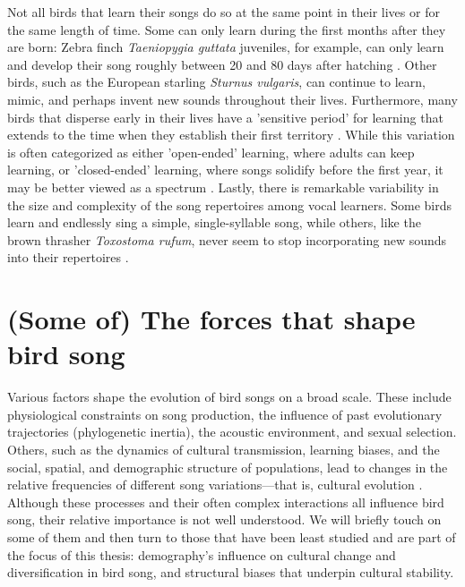 Not all birds that learn their songs do so at the same point in their lives or for the same length of time. Some can only learn during the first months after they are born: Zebra finch \textit{Taeniopygia guttata} juveniles, for example, can only learn and develop their song roughly between 20 and 80 days after hatching \autocite{liu2004}. Other birds, such as the European starling \textit{Sturnus vulgaris},  can continue to learn, mimic, and perhaps invent new sounds throughout their lives. Furthermore, many birds that disperse early in their lives have a 'sensitive period’ for learning that extends to the time when they establish their first territory \autocite{beecher2005,liu2004}. While this variation is often categorized as either 'open-ended' learning, where adults can keep learning, or 'closed-ended' learning, where songs solidify before the first year, it may be better viewed as a spectrum \autocite{brenowitz2005}. Lastly, there is remarkable variability in the size and complexity of the song repertoires among vocal learners. Some birds learn and endlessly sing a simple, single-syllable song, while others, like the brown thrasher \textit{Toxostoma rufum}, never seem to stop incorporating new sounds into their repertoires \autocite{Boughey1981}.

\section{(Some of) The forces that shape bird song}
Various factors shape the evolution of bird songs on a broad scale. These include physiological constraints on song production, the influence of past evolutionary trajectories (phylogenetic inertia), the acoustic environment, and sexual selection. Others, such as the dynamics of cultural transmission, learning biases, and the social, spatial, and demographic structure of populations, lead to changes in the relative frequencies of different song variations---that is, cultural evolution \autocite{whiten2019}. Although these processes and their often complex interactions all influence bird song, their relative importance is not well understood. We will briefly touch on some of them and then turn to those that have been least studied and are part of the focus of this thesis: demography’s influence on cultural change and diversification in bird song, and structural biases that underpin cultural stability.

